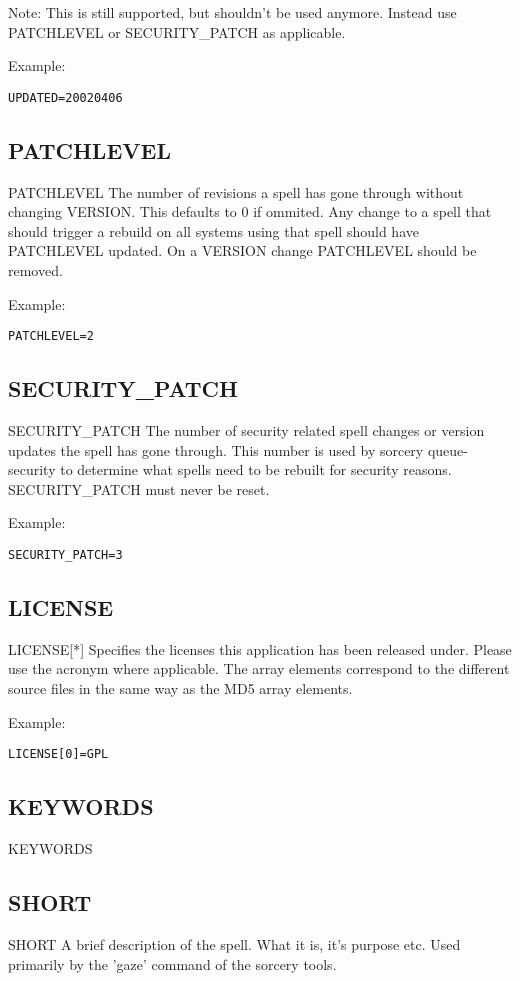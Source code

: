 \documentclass[a4paper,10pt]{book}
\begin{document}
Note: This is still supported, but shouldn't be used anymore. Instead use
PATCHLEVEL or SECURITY\_PATCH as applicable.

Example:
\begin{verbatim}
UPDATED=20020406
\end{verbatim}

\subsection{PATCHLEVEL}
PATCHLEVEL
	The number of revisions a spell has gone through without changing
	VERSION. This defaults to 0 if ommited. Any change to a spell that
	should trigger a rebuild on all systems using that spell should have
	PATCHLEVEL updated. On a VERSION change PATCHLEVEL should be removed.

Example:
\begin{verbatim}
PATCHLEVEL=2
\end{verbatim}

\subsection{SECURITY\_PATCH}
SECURITY\_PATCH
	The number of security related spell changes or version updates the
	spell has gone through. This number is used by sorcery queue-security
	to determine what spells need to be rebuilt for security reasons.
	SECURITY\_PATCH must never be reset.

Example:
\begin{verbatim}
SECURITY_PATCH=3
\end{verbatim}

\subsection{LICENSE}
LICENSE[*]
	Specifies the licenses this application has been released under.
	Please use the acronym where applicable. The array elements
	correspond to the different source files in the same way as the MD5
	array elements.

Example:
\begin{verbatim}
LICENSE[0]=GPL
\end{verbatim}

\subsection{KEYWORDS}
KEYWORDS

\subsection{SHORT}
SHORT
	A brief description of the spell. What it is, it's purpose etc. Used
	primarily by the 'gaze' command of the sorcery tools.
\end{document}
